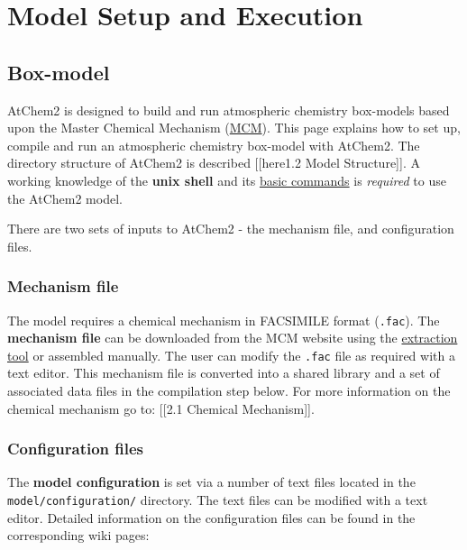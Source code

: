 \chapter{Model Setup and Execution} \label{ch:setup}

\section{Box-model} \label{sec:boxmodel}

AtChem2 is designed to build and run atmospheric chemistry box-models
based upon the Master Chemical Mechanism
(\href{http://mcm.leeds.ac.uk/MCM/}{MCM}). This page explains how to
set up, compile and run an atmospheric chemistry box-model with
AtChem2. The directory structure of AtChem2 is described
{[}{[}here\textbar{}1.2 Model Structure{]}{]}. A working knowledge of
the \textbf{unix shell} and its
\href{https://swcarpentry.github.io/shell-novice/reference/}{basic
commands} is \emph{required} to use the AtChem2 model.

There are two sets of inputs to AtChem2 - the mechanism file, and
configuration files.

\subsection{Mechanism file} \label{subsec:mechanism-file}

The model requires a chemical mechanism in FACSIMILE format
(\texttt{.fac}). The \textbf{mechanism file} can be downloaded from
the MCM website using the
\href{http://mcm.leeds.ac.uk/MCMv3.3.1/extract.htt}{extraction tool}
or assembled manually. The user can modify the \texttt{.fac} file as
required with a text editor. This mechanism file is converted into a
shared library and a set of associated data files in the compilation
step below. For more information on the chemical mechanism go to:
{[}{[}2.1 Chemical Mechanism{]}{]}.

\subsection{Configuration files} \label{subsec:configuration-files}

The \textbf{model configuration} is set via a number of text files
located in the \texttt{model/configuration/} directory. The text files
can be modified with a text editor. Detailed information on the
configuration files can be found in the corresponding wiki pages:

